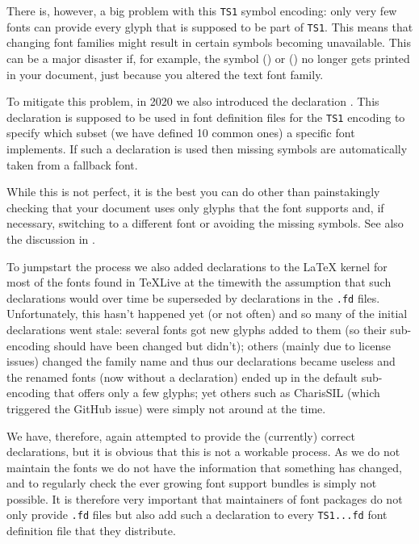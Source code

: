 \documentclass{ltnews}
\providecommand\Dash {\unskip \textemdash}
\begin{document}
There is, however, a big problem with this \texttt{TS1} symbol
encoding: only very few fonts can provide every glyph that is supposed
to be part of \texttt{TS1}. This means that changing font families
might result in certain symbols becoming unavailable. This can be a
major disaster if, for example,
the symbol  (\texteuro) or  (\textohm)
no longer gets printed in your document, just because you altered the
text font family.

To mitigate this problem, in 2020 we also introduced the declaration
. This declaration is supposed to be used in
font definition files for the \texttt{TS1} encoding to specify which
subset (we have defined 10 common ones) a specific font implements. If
such a declaration is used then missing symbols are automatically
taken from a fallback font.

While this is not perfect, it is the best
you can do other than painstakingly checking that your document
uses only glyphs that the font supports
and, if necessary, switching to a different font or avoiding the
missing symbols. See also the discussion in \cite{39:ltnews33}.

To jumpstart the process we also added declarations to the \LaTeX{}
kernel for most of the fonts found in \TeX{}Live at the time\Dash with
the assumption that such declarations would over time be superseded by
declarations in the \texttt{.fd} files. Unfortunately, this hasn't
happened yet (or not often) and so many of the initial declarations
went stale: several fonts got new glyphs added to them (so their
sub-encoding should have been changed but didn't); others (mainly due
to license issues) changed the family name and thus our declarations
became useless and the renamed fonts (now without a declaration) ended
up in the default sub-encoding that offers only a few glyphs;
yet others such as CharisSIL (which triggered the GitHub issue) were
simply not around at the time.

We have, therefore, again attempted to provide the (currently) correct
declarations, but it is obvious that this is not a workable
process. As we do not maintain the fonts we do not have the
information that something has changed, and to regularly check the
ever growing font support bundles is simply not possible. It is
therefore very important that maintainers of font packages do not only
provide \texttt{.fd} files but also add such a declaration to every
\texttt{TS1...fd} font definition file that they distribute.
\end{document}
